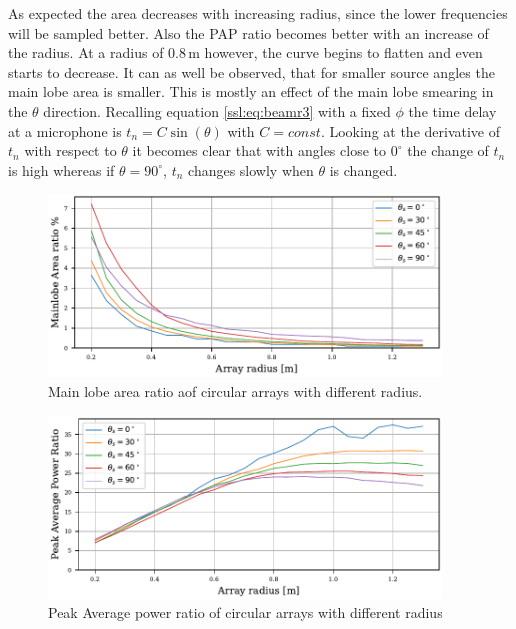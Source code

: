 As expected the area decreases with increasing radius, since the lower frequencies will be
sampled better.
Also the PAP ratio becomes better with an increase of the radius.
At a radius of 0.8\,m however, the curve begins to flatten and even starts to decrease.
It can as well be observed, that for smaller source angles the main lobe area is smaller.
This is mostly an effect of the main lobe smearing in the $\theta$ direction.
Recalling equation \eqref{ssl:eq:beamr3} with a fixed $\phi$
the time delay at a microphone is $t_n = C \sin(\theta)$ with $C=const$.
Looking at the derivative of $t_n$ with respect to $\theta$ it becomes
clear that with angles close to $0^\circ$ the change of $t_n$ is high
whereas if $\theta = 90^\circ$, $t_n$ changes slowly when $\theta$ is
changed.
\begin{figure}[h]
	\centering
	\includegraphics[width=0.93\textwidth, trim={0 0.2cm 0 0.2cm}]{images/5_array_evaluation/area_circ.pdf}
	\caption{Main lobe area ratio aof circular arrays with different radius.}
	\label{aev:fig:areaCirc}
\end{figure}

\newpage
\begin{figure}[ht]
	\centering
	\includegraphics[width=0.93\textwidth, trim={0 0.2cm 0 0.2cm}]{images/5_array_evaluation/PAP_circ.pdf}
	\caption{Peak Average power ratio of circular arrays with different radius}
	\label{aev:fig:papCirc}
\end{figure}


